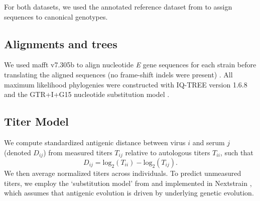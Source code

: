 \documentclass[11pt,oneside,letterpaper]{article}
\begin{document}
For both datasets, we used the annotated reference dataset from \citep{pyke2016highly} to assign sequences to canonical genotypes.

\subsection*{Alignments and trees}
We used mafft v7.305b to align nucleotide \textit{E} gene sequences for each strain before translating the aligned sequences (no frame-shift indels were present) \citep{katoh2013mafft}.
All maximum likelihood phylogenies were constructed with IQ-TREE version 1.6.8 and the GTR+I+G15 nucleotide substitution model \citep{nguyen2014iq}.

\subsection*{Titer Model}
We compute standardized antigenic distance between virus $i$ and serum $j$ (denoted $D_{ij}$) from measured titers $T_{ij}$ relative to autologous titers $T_{ii}$, such that
\begin{equation}
  \label{eq_titer_norm}
D_{ij} = \mathrm{log}_2(T_{ii}) - \mathrm{log}_2(T_{ij}).
\end{equation}
We then average normalized titers across individuals.
To predict unmeasured titers, we employ the `substitution model' from \citet{neher2016prediction} and implemented in Nextstrain \citep{hadfield2018nextstrain}, which assumes that antigenic evolution is driven by underlying genetic evolution.
\end{document}
